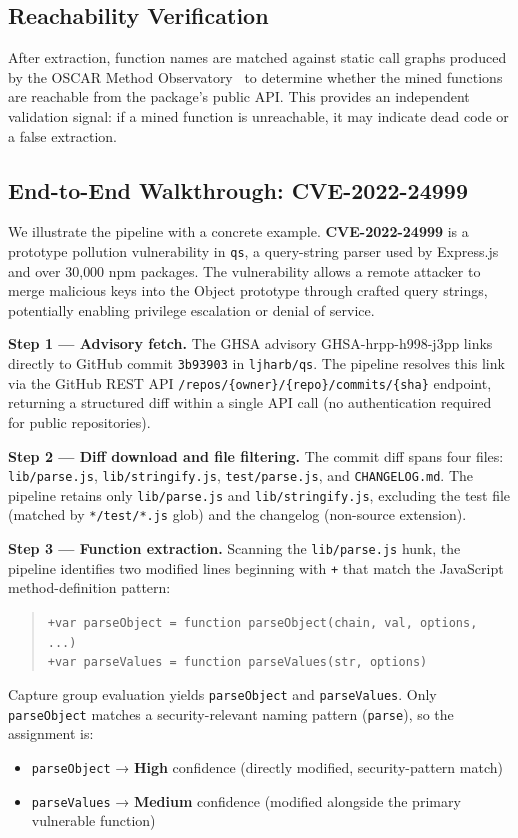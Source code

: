 \documentclass[sigconf,nonacm]{acmart}
\begin{document}
\subsection{Reachability Verification}

After extraction, function names are matched against static call graphs
produced by the OSCAR Method Observatory~\cite{oscar-icsme} to determine
whether the mined functions are reachable from the package's public API.
This provides an independent validation signal: if a mined function is
unreachable, it may indicate dead code or a false extraction.

\subsection{End-to-End Walkthrough: CVE-2022-24999}
\label{subsec:walkthrough}

We illustrate the pipeline with a concrete example.
\textbf{CVE-2022-24999} is a prototype pollution vulnerability in \texttt{qs},
a query-string parser used by Express.js and over 30{,}000 npm packages.
The vulnerability allows a remote attacker to merge malicious keys into the
Object prototype through crafted query strings, potentially enabling
privilege escalation or denial of service.

\textbf{Step 1 — Advisory fetch.}
The GHSA advisory GHSA-hrpp-h998-j3pp links directly to GitHub commit
\texttt{3b93903} in \texttt{ljharb/qs}.
The pipeline resolves this link via the GitHub REST API \texttt{/repos/\{owner\}/\{repo\}/commits/\{sha\}} endpoint,
returning a structured diff within a single API call (no authentication required for public repositories).

\textbf{Step 2 — Diff download and file filtering.}
The commit diff spans four files:
\texttt{lib/parse.js}, \texttt{lib/stringify.js},
\texttt{test/parse.js}, and \texttt{CHANGELOG.md}.
The pipeline retains only \texttt{lib/parse.js} and \texttt{lib/stringify.js},
excluding the test file (matched by \texttt{*/test/*.js} glob) and the
changelog (non-source extension).

\textbf{Step 3 — Function extraction.}
Scanning the \texttt{lib/parse.js} hunk, the pipeline identifies two
modified lines beginning with \texttt{+} that match the JavaScript
method-definition pattern:
\begin{quote}\small
\texttt{+var parseObject = function parseObject(chain, val, options, ...)}\\
\texttt{+var parseValues = function parseValues(str, options)}
\end{quote}
Capture group evaluation yields \texttt{parseObject} and \texttt{parseValues}.
Only \texttt{parseObject} matches a security-relevant naming pattern
(\texttt{parse}), so the assignment is:
\begin{itemize}
    \item \texttt{parseObject} → \textbf{High} confidence (directly
    modified, security-pattern match)
    \item \texttt{parseValues} → \textbf{Medium} confidence (modified
    alongside the primary vulnerable function)
\end{itemize}
\end{document}
